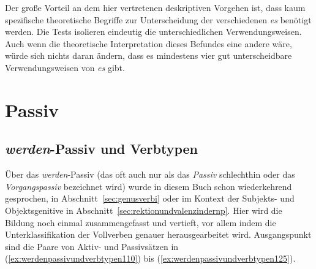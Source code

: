 Der große Vorteil an dem hier vertretenen deskriptiven Vorgehen ist, dass kaum spezifische theoretische Begriffe zur Unterscheidung der verschiedenen \textit{es} benötigt werden.
Die Tests isolieren eindeutig die unterschiedlichen Verwendungsweisen.
Auch wenn die theoretische Interpretation dieses Befundes eine andere wäre, würde sich nichts daran ändern, dass es mindestens vier gut unterscheidbare Verwendungsweisen von \textit{es} gibt.



\section{Passiv}
\label{sec:passiv}

\subsection{\textit{werden}-Passiv und Verbtypen}
\label{sec:werdenpassivundverbtypen}


Über das \textit{werden}-Passiv (das oft auch nur als das \textit{Passiv} schlechthin oder das \textit{Vorgangspassiv} bezeichnet wird) wurde in diesem Buch schon wiederkehrend gesprochen, \zB in Abschnitt~\ref{sec:genusverbi} oder im Kontext der Subjekts- und Objektsgenitive in Abschnitt~\ref{sec:rektionundvalenzindernp}.
Hier wird die Bildung noch einmal zusammengefasst und vertieft, vor allem indem die Unterklassifikation der Vollverben genauer herausgearbeitet wird.
Ausgangspunkt sind die Paare von Aktiv- und Passivsätzen in (\ref{ex:werdenpassivundverbtypen110}) bis (\ref{ex:werdenpassivundverbtypen125}).

